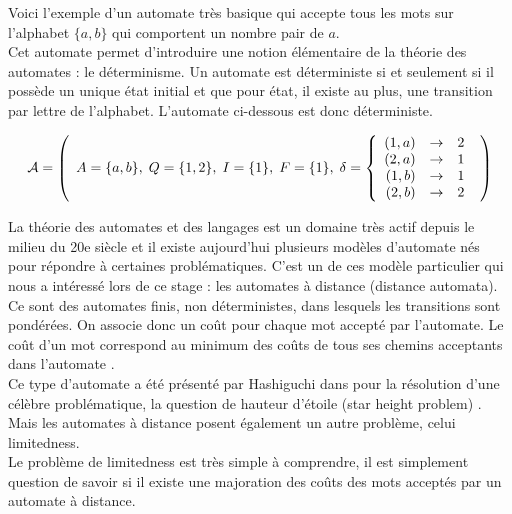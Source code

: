 \documentclass{report}
\begin{document}
Voici l'exemple d'un automate très basique qui accepte tous les mots sur l'alphabet $\{a, b\}$ qui comportent un nombre pair de $a$.\\
Cet automate permet d'introduire une notion élémentaire de la théorie des automates : le déterminisme. Un automate est déterministe si et seulement si il possède un unique état initial et que pour état, il existe au plus, une transition par lettre de l'alphabet. L'automate ci-dessous est donc déterministe.

\[\mathcal{A} = \left(
\begin{array}{rcr}
			A= \{a, b\},\;
			Q=\{1, 2\},\; 
			I=\{1\},\; 
			F=\{1\},\; 
			\delta=
				\left\{
					\begin{array}{rcr}
						(1,a) & \rightarrow & 2 \\
						(2,a) & \rightarrow & 1 \\
						(1,b) & \rightarrow & 1 \\
						(2,b) & \rightarrow & 2 \\
					\end{array}
				\right.
\end{array}
\right)\]

\begin{center}
\end{center}

La théorie des automates et des langages est un domaine très actif depuis le milieu du 20e siècle et il existe aujourd'hui plusieurs modèles d'automate nés pour répondre à certaines problématiques. C'est un de ces modèle particulier qui nous a intéressé lors de ce stage : les automates à distance (distance automata).
\\
Ce sont des automates finis, non déterministes, dans lesquels les transitions sont pondérées. On associe donc un coût pour chaque mot accepté par l'automate. Le coût d'un mot correspond au minimum des coûts de tous ses chemins acceptants dans l'automate .\\
Ce type d'automate a été présenté par Hashiguchi dans \cite{Hashiguchi:Limitedness-theorem-on-finite-automata-with-distance-functions:1982:a} pour la résolution d'une célèbre problématique, la question de hauteur d'étoile (star height problem) \cite{Eggan:Transition-graphs-and-the-star-height-of-regular-events:1963:a}. Mais les automates à distance posent également un autre problème, celui limitedness.\\
Le problème de limitedness est très simple à comprendre, il est simplement question de savoir si il existe une majoration des coûts des mots acceptés par un automate à distance.\\
\end{document}
